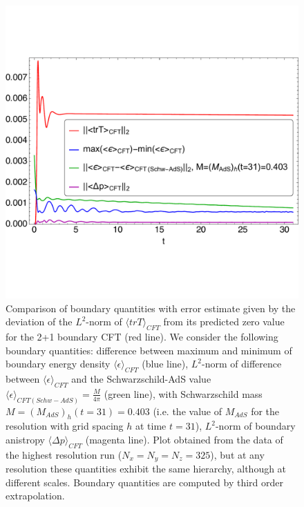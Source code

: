 \documentclass[a4paper,11pt]{article}
\numberwithin{equation}{section}
\begin{document}

\begin{figure}[!h]
        \centering
        \includegraphics[width=5.0in,clip=true]{plots/timeseries/L2-norm_trace_anisotropy_energydensityminusschw_maxminusminenergydensity/fullplotfillregttraceanisotropyenergydensityminusschwmaxminusminbdyenergydensity_L3.pdf}
\parbox{5.0in}{\caption{Comparison of boundary quantities with error estimate given by the deviation of the $L^2$-norm of $\langle trT\rangle_{CFT}$ from its predicted zero value for the 2+1 boundary CFT (red line). We consider the following boundary quantities: difference between maximum and minimum of boundary energy density $\langle\epsilon\rangle_{CFT}$ (blue line), $L^2$-norm of difference between $\langle\epsilon\rangle_{CFT}$ and the Schwarzschild-AdS value $\langle\epsilon\rangle_{CFT(Schw-AdS)}=\frac{M}{4\pi}$ (green line), with Schwarzschild mass $M=(M_{AdS})_h(t=31)=0.403$ (i.e. the value of $M_{AdS}$ for the resolution with grid spacing $h$ at time $t=31$), $L^2$-norm of boundary anistropy $\langle\Delta p\rangle_{CFT}$ (magenta line). Plot obtained from the data of the highest resolution run ($N_x=N_y=N_z=325$), but at any resolution these quantities exhibit the same hierarchy, although at different scales. Boundary quantities are computed by third order extrapolation.
        }\label{fig:fullplotfillregttraceanisotropyenergydensityminusschwmaxminusminbdyenergydensity.pdf}}
\end{figure}
\end{document}
